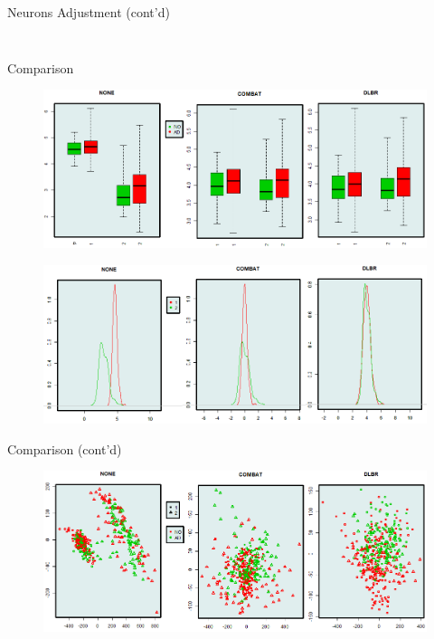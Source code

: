 \documentclass{beamer}
\begin{document}
\begin{frame}{Neurons Adjustment (cont'd)}
\begin{columns}
\begin{column}[t]{.48\textwidth}
\begin{figure}[ht]
        \caption*{\label{fig:tsne-after}}
      \end{figure}
    \end{column}
  \end{columns}
\end{frame}
\begin{frame}{Comparison}
  \begin{figure}[ht]
    \centering
    \includegraphics[height=0.4\textheight]{figures/fig7a}
    \caption*{\label{fig:7a}}
  \end{figure}
  \vspace{-1cm}
  \begin{figure}[ht]
    \centering
    \includegraphics[height=0.4\textheight]{figures/fig7b}
    \caption*{\label{fig:7b}}
  \end{figure}
\end{frame}
\begin{frame}{Comparison (cont'd)}
  \begin{figure}[ht]
    \centering
    \includegraphics[width=1.0\textwidth]{figures/fig7d}
    \caption*{\label{fig:7d}}
  \end{figure}
\end{frame}
\end{document}
